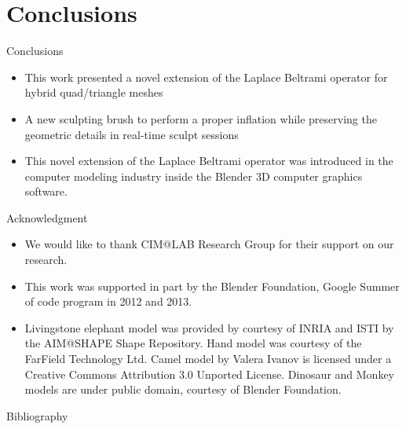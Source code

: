 \documentclass[10pt, compress, english]{beamer}
\begin{document}
\section{Conclusions}
\begin{frame}{Conclusions}

\begin{itemize}
\item This work presented a novel extension of the Laplace Beltrami operator
for hybrid quad/triangle meshes
\pause{}
\item A new sculpting brush to perform a proper inflation while preserving
the geometric details in real-time sculpt sessions
\pause{}
\item This novel extension of the Laplace Beltrami operator was introduced
in the computer modeling industry inside the Blender 3D computer graphics
software.
\end{itemize}
\end{frame}

\begin{frame}{Acknowledgment}

\begin{itemize}
\item We would like to thank CIM@LAB Research Group for their support on
our research.
\item This work was supported in part by the Blender Foundation, Google
Summer of code program in 2012 and 2013. 
\item Livingstone elephant model was provided by courtesy of INRIA and ISTI
by the AIM@SHAPE Shape Repository. Hand model was courtesy of the FarField
Technology Ltd. Camel model by Valera Ivanov is licensed under a Creative
Commons Attribution 3.0 Unported License. Dinosaur and Monkey models
are under public domain, courtesy of Blender Foundation.
\end{itemize}

\end{frame}

 \begin{frame}[allowframebreaks]{Bibliography}


{\scriptsize{}
\nocite{*}

}{\scriptsize \par}

\end{frame}
 

 
\end{document}
